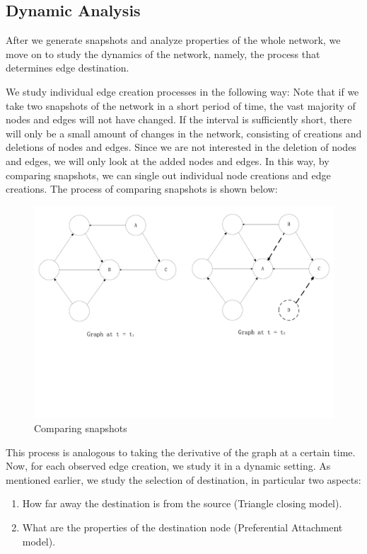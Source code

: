 \documentclass[10pt]{article}
\begin{document}
\begin{multicols}{2}
\section{Dynamic Analysis}
After we generate snapshots and analyze properties of the whole network, we move on to study the dynamics of the network, namely, the process that determines edge destination.

We study individual edge creation processes in the following way: Note that if we take two snapshots of the network in a short period of time, the vast majority of nodes and edges will not have changed. If the interval is sufficiently short, there will only be a small amount of changes in the network, consisting of creations and deletions of nodes and edges. Since we are not interested in the deletion of nodes and edges, we will only look at the added nodes and edges. In this way, by comparing snapshots, we can single out individual node creations and edge creations. The process of comparing snapshots is shown below:
\begin{figure}[H]
    \centering
        \includegraphics[scale = 0.25, trim = 0cm 8cm 0cm 0cm]{./graphs/dynamic.pdf}
    \caption{Comparing snapshots} \label{fig:compare}
\end{figure}

This process is analogous to taking the derivative of the graph at a certain time. Now, for each observed edge creation, we study it in a dynamic setting. As mentioned earlier, we study the selection of destination, in particular two aspects:
\begin{enumerate}
\item How far away the destination is from the source (Triangle closing model).
\item What are the properties of the destination node (Preferential Attachment model).
\end{enumerate}


\end{multicols}
\end{document}

